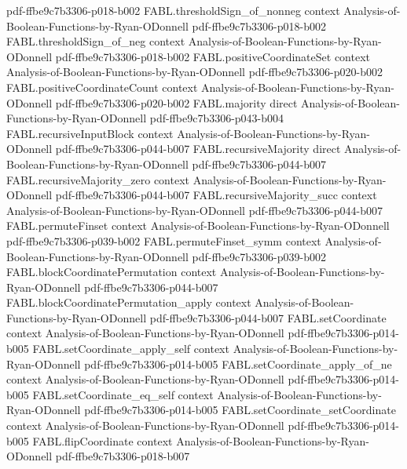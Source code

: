 \begin{theorem}
  {pdf-ffbe9c7b3306-p018-b002}
\proofstep
  {FABL.thresholdSign_of_nonneg}
  {context}
  {Analysis-of-Boolean-Functions-by-Ryan-ODonnell}
  {pdf-ffbe9c7b3306-p018-b002}
\proofstep
  {FABL.thresholdSign_of_neg}
  {context}
  {Analysis-of-Boolean-Functions-by-Ryan-ODonnell}
  {pdf-ffbe9c7b3306-p018-b002}
\proofstep
  {FABL.positiveCoordinateSet}
  {context}
  {Analysis-of-Boolean-Functions-by-Ryan-ODonnell}
  {pdf-ffbe9c7b3306-p020-b002}
\proofstep
  {FABL.positiveCoordinateCount}
  {context}
  {Analysis-of-Boolean-Functions-by-Ryan-ODonnell}
  {pdf-ffbe9c7b3306-p020-b002}
\proofstep
  {FABL.majority}
  {direct}
  {Analysis-of-Boolean-Functions-by-Ryan-ODonnell}
  {pdf-ffbe9c7b3306-p043-b004}
\proofstep
  {FABL.recursiveInputBlock}
  {context}
  {Analysis-of-Boolean-Functions-by-Ryan-ODonnell}
  {pdf-ffbe9c7b3306-p044-b007}
\proofstep
  {FABL.recursiveMajority}
  {direct}
  {Analysis-of-Boolean-Functions-by-Ryan-ODonnell}
  {pdf-ffbe9c7b3306-p044-b007}
\proofstep
  {FABL.recursiveMajority_zero}
  {context}
  {Analysis-of-Boolean-Functions-by-Ryan-ODonnell}
  {pdf-ffbe9c7b3306-p044-b007}
\proofstep
  {FABL.recursiveMajority_succ}
  {context}
  {Analysis-of-Boolean-Functions-by-Ryan-ODonnell}
  {pdf-ffbe9c7b3306-p044-b007}
\proofstep
  {FABL.permuteFinset}
  {context}
  {Analysis-of-Boolean-Functions-by-Ryan-ODonnell}
  {pdf-ffbe9c7b3306-p039-b002}
\proofstep
  {FABL.permuteFinset_symm}
  {context}
  {Analysis-of-Boolean-Functions-by-Ryan-ODonnell}
  {pdf-ffbe9c7b3306-p039-b002}
\proofstep
  {FABL.blockCoordinatePermutation}
  {context}
  {Analysis-of-Boolean-Functions-by-Ryan-ODonnell}
  {pdf-ffbe9c7b3306-p044-b007}
\proofstep
  {FABL.blockCoordinatePermutation_apply}
  {context}
  {Analysis-of-Boolean-Functions-by-Ryan-ODonnell}
  {pdf-ffbe9c7b3306-p044-b007}
\proofstep
  {FABL.setCoordinate}
  {context}
  {Analysis-of-Boolean-Functions-by-Ryan-ODonnell}
  {pdf-ffbe9c7b3306-p014-b005}
\proofstep
  {FABL.setCoordinate_apply_self}
  {context}
  {Analysis-of-Boolean-Functions-by-Ryan-ODonnell}
  {pdf-ffbe9c7b3306-p014-b005}
\proofstep
  {FABL.setCoordinate_apply_of_ne}
  {context}
  {Analysis-of-Boolean-Functions-by-Ryan-ODonnell}
  {pdf-ffbe9c7b3306-p014-b005}
\proofstep
  {FABL.setCoordinate_eq_self}
  {context}
  {Analysis-of-Boolean-Functions-by-Ryan-ODonnell}
  {pdf-ffbe9c7b3306-p014-b005}
\proofstep
  {FABL.setCoordinate_setCoordinate}
  {context}
  {Analysis-of-Boolean-Functions-by-Ryan-ODonnell}
  {pdf-ffbe9c7b3306-p014-b005}
\proofstep
  {FABL.flipCoordinate}
  {context}
  {Analysis-of-Boolean-Functions-by-Ryan-ODonnell}
  {pdf-ffbe9c7b3306-p018-b007}

\end{theorem}
